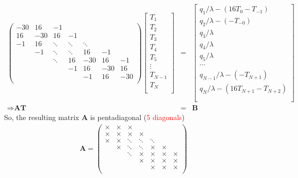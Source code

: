 \documentclass[12pt]{amsart}   %
\begin{document}
\begin{eqnarray}
 \begin{pmatrix}
-30 & 16 & -1 &&&&\\
16&-30 & 16 & -1 &&&\\
-1&16&\ddots & \ddots & \ddots&&\\
&-1&\ddots&\ddots & 16 & -1 &\\
&&\ddots&16& -30 & 16&-1 \\
&&&-1&16&  -30 & 16 \\
&&&&-1&16&  -30 \\
\end{pmatrix} \begin{bmatrix}
T_{1}\\
T_{2}\\
T_{3}\\
T_{4}\\
T_{5}\\
\vdots\\
T_{N-1}\\
T_{N}\\
\end{bmatrix} &=&
\begin{bmatrix}
{q_{1}}/{\lambda}-(16T_{0}-T_{-1})\\
{q_{2}}/{\lambda}-(-T_{-0})\\
{q_{3}}/{\lambda}\\
{q_{4}}/{\lambda}\\
{q_{5}}/{\lambda}\\
\cdots\\
{q_{N-1}}/{\lambda}-(-T_{N+1})\\
{q_{N}}/{\lambda}-(16T_{N+1}-T_{N+2}) \nonumber\\ \\
\end{bmatrix} \\ \Rightarrow \textbf{AT}&=&\textbf{B}
\end{eqnarray}
So, the resulting matrix \textbf{A} is pentadiagonal (\textcolor{red}{5 diagonals})
\begin{eqnarray}
\textbf{A} = \begin{pmatrix}
\times & \times & \times &&&&\\
\times&\times & \times & \times &&&\\
\times&\times&\ddots & \ddots & \ddots&&\\
& \times&\ddots&\ddots & \times & \times &\\
&&\ddots& \times& \times & \times& \times \\
&&&\times&\times&  \times & \times \\
&&&&\times&\times&  \times \\
\end{pmatrix}
\end{eqnarray}
\end{document}
